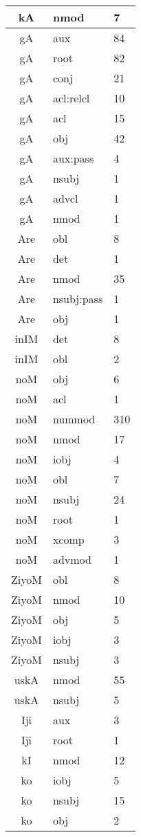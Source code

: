 \documentclass[a4 paper]{article}
\begin{document}
\begin{longtable}{cp{}p{}}
kA & nmod & 7\\ \midrule 
gA & aux & 84\\ \midrule gA & root & 82\\ \midrule gA & conj & 21\\ \midrule gA & acl:relcl & 10\\ \midrule gA & acl & 15\\ \midrule gA & obj & 42\\ \midrule gA & aux:pass & 4\\ \midrule gA & nsubj & 1\\ \midrule gA & advcl & 1\\ \midrule gA & nmod & 1\\ \midrule 
Are & obl & 8\\ \midrule Are & det & 1\\ \midrule Are & nmod & 35\\ \midrule Are & nsubj:pass & 1\\ \midrule Are & obj & 1\\ \midrule 
inIM & det & 8\\ \midrule inIM & obl & 2\\ \midrule 
noM & obj & 6\\ \midrule noM & acl & 1\\ \midrule noM & nummod & 310\\ \midrule noM & nmod & 17\\ \midrule noM & iobj & 4\\ \midrule noM & obl & 7\\ \midrule noM & nsubj & 24\\ \midrule noM & root & 1\\ \midrule noM & xcomp & 3\\ \midrule noM & advmod & 1\\ \midrule 
ZiyoM & obl & 8\\ \midrule ZiyoM & nmod & 10\\ \midrule ZiyoM & obj & 5\\ \midrule ZiyoM & iobj & 3\\ \midrule ZiyoM & nsubj & 3\\ \midrule 
uskA & nmod & 55\\ \midrule uskA & nsubj & 5\\ \midrule 
Iji & aux & 3\\ \midrule Iji & root & 1\\ \midrule 
kI & nmod & 12\\ \midrule 
ko & iobj & 5\\ \midrule ko & nsubj & 15\\ \midrule ko & obj & 2\\ \midrule 

\end{longtable}
\end{document}
